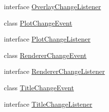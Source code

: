 \begin{DoxyCompactItemize}
interface \mbox{\hyperlink{interfaceorg_1_1jfree_1_1chart_1_1event_1_1_overlay_change_listener}{Overlay\+Change\+Listener}}
\item 
class \mbox{\hyperlink{classorg_1_1jfree_1_1chart_1_1event_1_1_plot_change_event}{Plot\+Change\+Event}}
\item 
interface \mbox{\hyperlink{interfaceorg_1_1jfree_1_1chart_1_1event_1_1_plot_change_listener}{Plot\+Change\+Listener}}
\item 
class \mbox{\hyperlink{classorg_1_1jfree_1_1chart_1_1event_1_1_renderer_change_event}{Renderer\+Change\+Event}}
\item 
interface \mbox{\hyperlink{interfaceorg_1_1jfree_1_1chart_1_1event_1_1_renderer_change_listener}{Renderer\+Change\+Listener}}
\item 
class \mbox{\hyperlink{classorg_1_1jfree_1_1chart_1_1event_1_1_title_change_event}{Title\+Change\+Event}}
\item 
interface \mbox{\hyperlink{interfaceorg_1_1jfree_1_1chart_1_1event_1_1_title_change_listener}{Title\+Change\+Listener}}
\end{DoxyCompactItemize}
